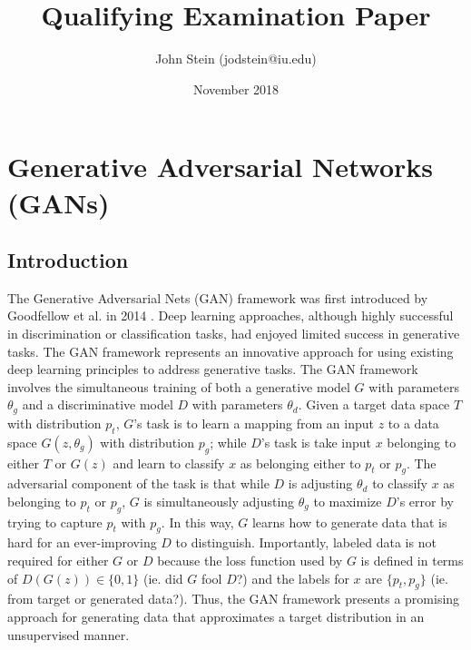 \documentclass[11pt]{article}
\title{Qualifying Examination Paper}
\author{John Stein (jodstein@iu.edu)}
\date{November 2018}
\begin{document}
\begin{titlepage}
    \null
    \nointerlineskip
    \vfill
    \let\snewpage \newpage
    \let\newpage \relax
    \maketitle
    \let \newpage \snewpage
    \vfill
    \thispagestyle{empty}
\end{titlepage}


\tableofcontents
\thispagestyle{empty}


\newpage
\setcounter{page}{1}
\section{Generative Adversarial Networks (GANs)}

\subsection{Introduction}
The Generative Adversarial Nets (GAN) framework was first introduced by Goodfellow et al. in 2014 \cite{NIPS2014_5423}.  Deep learning approaches, although highly successful in discrimination or classification tasks, had enjoyed limited success in generative tasks.  The GAN framework represents an innovative approach for using existing deep learning principles to address generative tasks.  The GAN framework involves the simultaneous training of both a generative model $G$ with parameters $\theta_g$ and a discriminative model $D$ with parameters $\theta_d$.  Given a target data space $T$ with distribution $p_t$, $G$'s task is to learn a mapping from an input $z$ to a data space $G(z, \theta_g)$ with distribution $p_g$; while $D$'s task is take input $x$ belonging to either $T$ or $G(z)$ and learn to classify $x$ as belonging either to $p_t$ or $p_g$.  The adversarial component of the task is that while $D$ is adjusting $\theta_d$ to classify $x$ as belonging to $p_t$ or $p_g$, $G$ is simultaneously adjusting $\theta_g$ to maximize $D$'s error by trying to capture $p_t$ with $p_g$.  In this way, $G$ learns how to generate data that is hard for an ever-improving $D$ to distinguish.  Importantly, labeled data is not required for either $G$ or $D$ because the loss function used by $G$ is defined in terms of $D(G(z)) \in \{0, 1\}$ (ie. did $G$ fool $D$?) and the labels for $x$ are $\{p_t, p_g\}$ (ie. from target or generated data?).  Thus, the GAN framework presents a promising approach for generating data that approximates a target distribution in an unsupervised manner.
\end{document}

